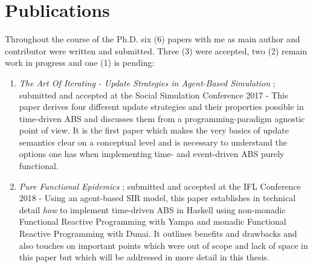 \section*{Publications}
Throughout the course of the Ph.D. six (6) papers with me as main author and contributor were written and submitted. Three (3) were accepted, two (2) remain work in progress and one (1) is pending:


\begin{enumerate}
	\item \textit{The Art Of Iterating - Update Strategies in Agent-Based Simulation} \cite{thaler_art_2017, payne_social_2019}; submitted and accepted at the Social Simulation Conference 2017 - This paper derives four different update strategies and their properties possible in time-driven ABS and discusses them from a programming-paradigm agnostic point of view. It is the first paper which makes the very basics of update semantics clear on a conceptual level and is necessary to understand the options one has when implementing time- and event-driven ABS purely functional. %
	
	\item \textit{Pure Functional Epidemics} \cite{thaler_pure_2018}; submitted and accepted at the IFL Conference 2018 - Using an agent-based SIR model, this paper establishes in technical detail \textit{how} to implement time-driven ABS in Haskell using non-monadic Functional Reactive Programming with Yampa and monadic Functional Reactive Programming with Dunai. It outlines benefits and drawbacks and also touches on important points which were out of scope and lack of space in this paper but which will be addressed in more detail in this thesis. %
	

\end{enumerate}
